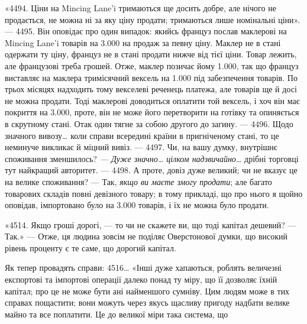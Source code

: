 «4494. Ціни на Mincing Lane’i тримаються ще досить добре, але нічого
не продається, не можна ні за яку ціну продати; тримаються лише номінальні
ціни». — 4495. Він оповідає про один випадок: якийсь француз послав маклерові
на Mincing Lane’i товарів на \num{3.000} на продаж за певну ціну. Маклер
не в стані одержати ту ціну, француз не в стані продати нижче від тієї
ціни. Товар лежить, але французові треба грошей. Отже, маклер позичає йому \num{1.000}, так що
француз виставляє на маклера тримісячний вексель на \num{1.000} під забезпечення товарів. По трьох
місяцях надходить тому векселеві
реченець платежа, але товарів ще й досі не можна продати. Тоді маклерові
доводиться оплатити той вексель, і хоч він має покриття на \num{3.000},
проте, він не може його перетворити на готівку та опиняється в скрутному
стані. Отак один тягне за собою другого до загину. — 4496. Щодо значного
вивозу\dots{} коли справи всередині країни в пригніченому стані, то це неминуче
викликає й міцний вивіз. — 4497. Чи, на вашу думку, внутрішнє споживання зменшилось?
\emph{— Дуже значно\dots{} цілком надзвичайно\dots{}} дрібні торговці тут
найкращий авторитет. — 4498. А проте, довіз дуже великий; чи не вказує це
на велике споживання? — Так, \emph{якщо ви маєте змогу продати}; але багато
товарових складів повні девізного товару; в тому прикладі, що про нього я щойно
оповідав, імпортовано було на \num{3.000} товарів, і їх не можна було продати.

«4514. Якщо гроші дорогі, — то чи не скажете ви, що тоді капітал дешевий?
— Так.» — Отже, ця людина зовсім не поділяє Оверстонової думки, що
високий рівень проценту є те саме, що дорогий капітал.

Як тепер провадять справи: 4516\dots{} «Інші дуже хапаються, роблять
величезні експортові та імпортові операції далеко понад ту міру, що її дозволяє
їхній капітал; про це не може бути ані найменшого сумніву. Цим людям
може в тих справах пощастити; вони можуть через якусь щасливу пригоду
надбати велике майно та все поплатити. Це до великої міри така система, що
\parbreak{}  %
